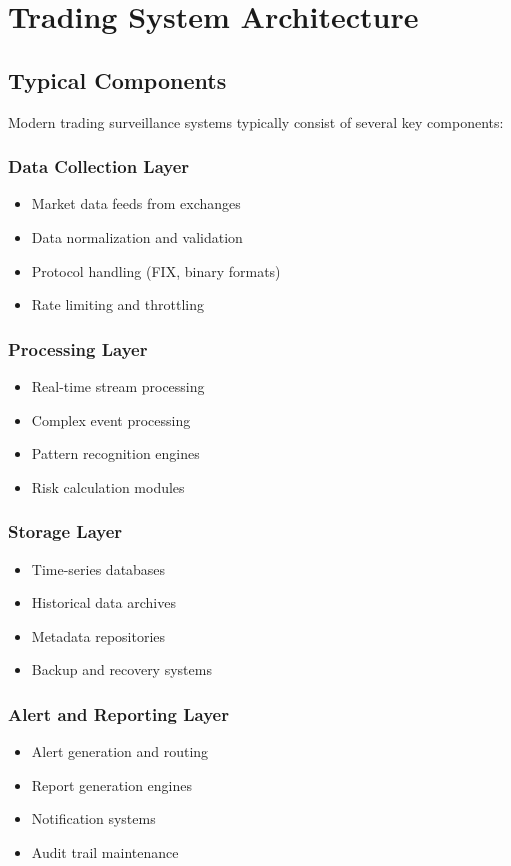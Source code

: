 \section{Trading System Architecture}

\subsection{Typical Components}

Modern trading surveillance systems typically consist of several key components:

\subsubsection{Data Collection Layer}
\begin{itemize}
    \item Market data feeds from exchanges
    \item Data normalization and validation
    \item Protocol handling (FIX, binary formats)
    \item Rate limiting and throttling
\end{itemize}

\subsubsection{Processing Layer}
\begin{itemize}
    \item Real-time stream processing
    \item Complex event processing
    \item Pattern recognition engines
    \item Risk calculation modules
\end{itemize}

\subsubsection{Storage Layer}
\begin{itemize}
    \item Time-series databases
    \item Historical data archives
    \item Metadata repositories
    \item Backup and recovery systems
\end{itemize}

\subsubsection{Alert and Reporting Layer}
\begin{itemize}
    \item Alert generation and routing
    \item Report generation engines
    \item Notification systems
    \item Audit trail maintenance
\end{itemize}

